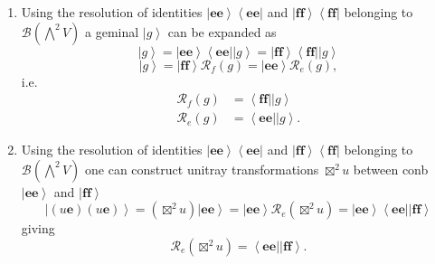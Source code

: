 \documentclass[aps,preprint]{revtex4}%
\begin{document}
\begin{enumerate}
\item Using the resolution of identities $\left\vert \mathbf{ee}\right\rangle
\left\langle \mathbf{ee}\right\vert $ and $\left\vert \mathbf{ff}\right\rangle
\left\langle \mathbf{ff}\right\vert $ belonging to $\mathcal{B}\left(
{\textstyle\bigwedge\nolimits^{2}}
V\right)  $ a geminal $\left\vert g\right\rangle $ can be expanded as
\begin{equation}
\left\vert g\right\rangle =\left\vert \mathbf{ee}\right\rangle \left\langle
\mathbf{ee}\right\vert \left\vert g\right\rangle =\left\vert \mathbf{ff}%
\right\rangle \left\langle \mathbf{ff}\right\vert \left\vert g\right\rangle
\end{equation}%
\begin{equation}
\left\vert g\right\rangle =\left\vert \mathbf{ff}\right\rangle \mathcal{R}%
_{f}\left(  g\right)  =\left\vert \mathbf{ee}\right\rangle \mathcal{R}%
_{e}\left(  g\right)  ,
\end{equation}
i.e.%
\begin{align}
\mathcal{R}_{f}\left(  g\right)   &  =\left\langle \mathbf{ff}\right\vert
\left\vert g\right\rangle \\
\mathcal{R}_{e}\left(  g\right)   &  =\left\langle \mathbf{ee}\right\vert
\left\vert g\right\rangle .
\end{align}


\item Using the resolution of identities $\left\vert \mathbf{ee}\right\rangle
\left\langle \mathbf{ee}\right\vert $ and $\left\vert \mathbf{ff}\right\rangle
\left\langle \mathbf{ff}\right\vert $ belonging to $\mathcal{B}\left(
{\textstyle\bigwedge\nolimits^{2}}
V\right)  $ one can construct unitray transformations $\boxtimes^{2}u$ between
conb $\left\vert \mathbf{ee}\right\rangle $ and $\left\vert \mathbf{ff}%
\right\rangle $
\begin{equation}
\left\vert \left(  u\mathbf{e}\right)  \left(  u\mathbf{e}\right)
\right\rangle =\left(  \boxtimes^{2}u\right)  \left\vert \mathbf{ee}%
\right\rangle =\left\vert \mathbf{ee}\right\rangle \mathcal{R}_{e}\left(
\boxtimes^{2}u\right)  =\left\vert \mathbf{ee}\right\rangle \left\langle
\mathbf{ee}\right\vert \left\vert \mathbf{ff}\right\rangle
\end{equation}
giving
\begin{equation}
\mathcal{R}_{e}\left(  \boxtimes^{2}u\right)  =\left\langle \mathbf{ee}%
\right\vert \left\vert \mathbf{ff}\right\rangle .
\end{equation}



\end{enumerate}
\end{document}

